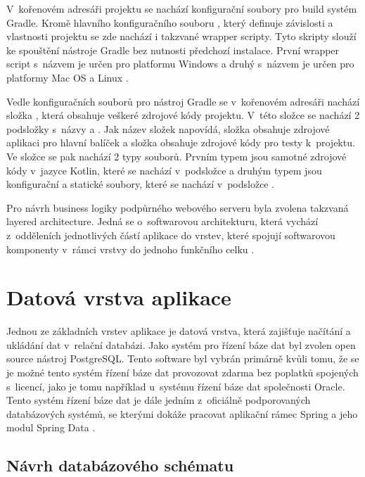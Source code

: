 V~kořenovém adresáři projektu se nachází konfigurační soubory pro build systém Gradle. Kromě hlavního konfiguračního souboru , který definuje závislosti a vlastnosti projektu se zde nachází i takzvané wrapper scripty. Tyto skripty slouží ke spouštění nástroje Gradle bez nutnosti předchozí instalace. První wrapper script s~názvem  je určen pro platformu Windows a druhý s~názvem  je určen pro platformy Mac OS a Linux \cite[kap. 3.4]{muschko_gradle_2014}.

Vedle konfiguračních souborů pro nástroj Gradle se v~kořenovém adresáři nachází složka , která obsahuje veškeré zdrojové kódy projektu. V~této složce se nachází 2 podsložky s~názvy  a . Jak název složek napovídá, složka  obsahuje zdrojové aplikaci pro hlavní balíček a složka  obsahuje zdrojové kódy pro testy k~projektu. Ve složce  se pak nachází 2 typy souborů. Prvním typem jsou samotné zdrojové kódy v~jazyce Kotlin, které se nachází v~podsložce  a druhým typem jsou konfigurační a statické soubory, které se nachází v~podsložce .

Pro návrh business logiky podpůrného webového serveru byla zvolena takzvaná layered architecture. Jedná se o~softwarovou architekturu, která vychází z~odděleních jednotlivých částí aplikace do vrstev, které spojují softwarovou komponenty v~rámci vrstvy do jednoho funkčního celku \cite{richards_software_architecture_patterns_2015}.

\section{Datová vrstva aplikace}

Jednou ze základních vrstev aplikace je datová vrstva, která zajišťuje načítání a ukládání dat v~relační databázi.
Jako systém pro řízení báze dat byl zvolen open source nástroj PostgreSQL. Tento software byl vybrán primárně kvůli tomu, že se je možné tento systém řízení báze dat provozovat zdarma bez poplatků spojených s~licencí, jako je tomu například u~systému řízení báze dat společnosti Oracle. Tento systém řízení báze dat je dále jedním z~oficiálně podporovaných databázových systémů, se kterými dokáže pracovat aplikační rámec Spring a jeho modul Spring Data \cite{spring_data}.

\subsection{Návrh databázového schématu}

